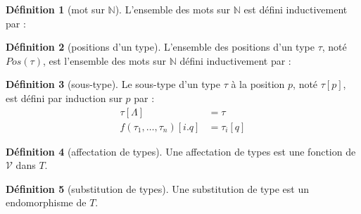 \documentclass [a4paper,12pt] {article}
\theoremstyle {definition}
\newtheorem {definition} {Définition} [section]
\newcommand {\interval} [2] {[\![#1\,;#2]\!]}
\newcommand {\V} {\mathscr V}
\begin{document}
\begin {definition} [mot sur $\mathbb N$]
	L'ensemble des mots sur $\mathbb N$ est défini inductivement par :
	\begin {center}
	\end {center}
\end {definition}

\begin {definition} [positions d'un type]
	L'ensemble des positions d'un type $\tau$, noté $Pos(\tau)$, est l'ensemble des mots sur $\mathbb N$ défini inductivement par :
	\begin {center}
	\end {center}
\end {definition}

\begin {definition} [sous-type]
	Le sous-type d'un type $\tau$ à la position $p$, noté $\tau [p]$, est défini par induction sur $p$ par :
	\begin {align*}
		\tau [\Lambda] &= \tau \\
		f (\tau_1, \dots, \tau_n) [i.q] &= \tau_i [q]
	\end {align*}
\end {definition}

\begin {definition} [affectation de types]
	Une affectation de types est une fonction de $\V$ dans $T$.
\end {definition}

\begin {definition} [substitution de types]
	Une substitution de type est un endomorphisme de $T$.
\end {definition}
\end{document}
